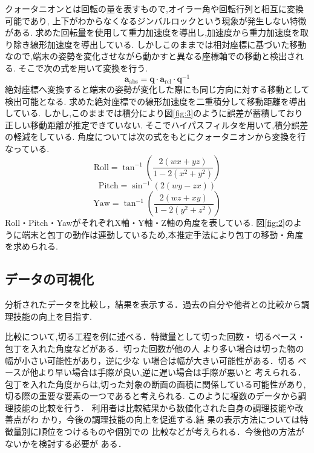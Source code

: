 クォータニオンとは回転の量を表すもので,オイラー角や回転行列と相互に変換可能であり,
上下がわからなくなるジンバルロックという現象が発生しない特徴がある.
求めた回転量を使用して重力加速度を導出し,加速度から重力加速度を取り除き線形加速度を導出している.
しかしこのままでは相対座標に基づいた移動なので,端末の姿勢を変化させながら動かすと異なる座標軸での移動と検出される.
そこで次の式を用いて変換を行う.
\[
\mathbf{a}_{\text{abs}} = \mathbf{q} \cdot \mathbf{a}_{\text{rel}} \cdot \mathbf{q}^{-1}
\]
絶対座標へ変換すると端末の姿勢が変化した際にも同じ方向に対する移動として検出可能となる.
求めた絶対座標での線形加速度を二重積分して移動距離を導出している.
しかし,このままでは積分により図\ref{fig:3}のように誤差が蓄積しており正しい移動距離が推定できていない.
そこでハイパスフィルタを用いて,積分誤差の軽減をしている.
角度については次の式をもとにクォータニオンから変換を行なっている.
    \[
	\text{Roll} = \tan^{-1}\left( \frac{2(w x + y z)}{1 - 2(x^2 + y^2)} \right)
	\]
	\[
	\text{Pitch} = \sin^{-1}\left( 2(w y - z x) \right)
	\]
	\[
	\text{Yaw} = \tan^{-1}\left( \frac{2(w z + x y)}{1 - 2(y^2 + z^2)} \right)
	\]
Roll・Pitch・YawがそれぞれX軸・Y軸・Z軸の角度を表している.
図\ref{fig:2}のように端末と包丁の動作は連動しているため,本推定手法により包丁の移動・角度を求められる.

\subsection{データの可視化}
分析されたデータを比較し，結果を表示する．過去の自分や他者との比較から調理技能の向上を目指す.

比較について,切る工程を例に述べる．特徴量として切った回数・
切るペース・包丁を入れた角度などがある．切った回数が他の人
より多い場合は切った物の幅が小さい可能性があり，逆に少な
い場合は幅が大きい可能性がある．切る
ペースが他より早い場合は手際が良い,逆に遅い場合は手際が悪いと
考えられる．包丁を入れた角度からは,切った対象の断面の面積に関係している可能性があり,切る際の重要な要素の一つであると考えられる.
このように複数のデータから調理技能の比較を行う．
利用者は比較結果から数値化された自身の調理技能や改善点がわ
かり，今後の調理技能の向上を促進する.結
果の表示方法については特徴量別に順位をつけるものや個別での
比較などが考えられる．今後他の方法がないかを検討する必要が
ある．
